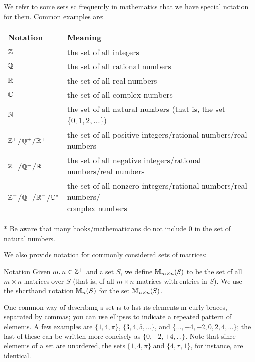 We refer to some sets so frequently in mathematics that we have special notation for them.  Common examples are:


\begin{center}
\renewcommand{\arraystretch}{1.3}
\begin{threeparttable}
\begin{tabular}{|l|l|}
\hline
\textbf{Notation}& \textbf{Meaning}\\
\hline
$\mathbb{Z}$ & the set of all integers\\
\hline
$\mathbb{Q}$ & the set of all rational numbers\\
\hline
$\mathbb{R}$ & the set of all real numbers\\
\hline
$\mathbb{C}$ & the set of all complex numbers\\
\hline
$\mathbb{N}$ & the set of all natural numbers (that is, the set $\{0, 1, 2, \ldots\}$)\tnote{*}\\
\hline
$\mathbb{Z}^+$/$\mathbb{Q}^+$/$\mathbb{R}^+$ & the set of all positive integers/rational numbers/real numbers\\
\hline
$\mathbb{Z}^-$/$\mathbb{Q}^-$/$\mathbb{R}^-$ & the set of all negative integers/rational numbers/real numbers\\
\hline
$\mathbb{Z}^-$/$\mathbb{Q}^-$/$\mathbb{R}^-$/$\mathbb{C}^*$ &   \pbox{20cm}{the set of all nonzero integers/rational numbers/real numbers/\\complex numbers}\\
\hline
\end{tabular}
\begin{tablenotes}
\item[*]\small Be aware that many books/mathematicians do not include 0 in the set of natural numbers.
\end{tablenotes}
\end{threeparttable}
\end{center}

We also provide notation for commonly considered sets of matrices:

\begin{df}{Notation} Given $m,n\in \mathbb{Z}^+$ and a set $S$, we define $\mathbb{M}_{m\times n}(S)$ to
be the set of all $m\times n$ matrices over $S$ (that is, of all $m\times n$ matrices with entries in $S$).  We use the
shorthand notation $\mathbb{M}_n(S)$ for the set $\mathbb{M}_{n\times n}(S)$.\end{df}

One common way of describing a set is to list its elements in
curly braces, separated by commas; you can use ellipses to
indicate a repeated pattern of elements. A few examples are
$\{1,4,\pi\}$, $\{3, 4, 5, \ldots\}$, and $\{\ldots, -4, -2, 0,
2, 4, \ldots\}$; the last of these can be written more concisely as $\{0,\pm 2, \pm 4,\ldots\}$.  Note that since elements of a set are
unordered, the sets $\{1,4,\pi\}$ and $\{4,\pi, 1\}$, for
instance, are identical.

